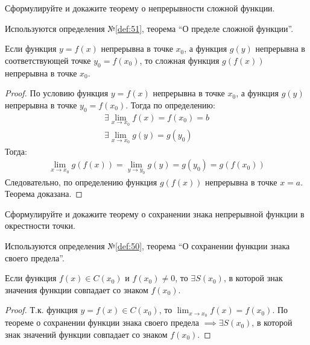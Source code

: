 \begin{question}
    Сформулируйте и докажите теорему о непрерывности сложной функции.
\end{question}
\begin{used}
    Используются определения №\ref{def:51}, теорема ``О пределе сложной функции''.
\end{used}
\begin{theorem}
    Если функция $y = f(x)$ непрерывна в точке $x_0$, а функция $g(y)$ непрерывна в соответствующей точке $y_0 = f(x_0)$, то сложная функция $g(f(x))$ непрерывна в точке $x_0$.
\end{theorem}
\begin{proof}
    По условию функция $y = f(x)$ непрерывна в точке $x_0$, а функция $g(y)$ непрерывна в точке $y_0 = f(x_0)$. Тогда по определению:
    \begin{gather*}
        \exists \lim_{x \to x_0} f(x) = f(x_0) = b \\
        \exists \lim_{x \to x_0} g(y) = g(y_0)
    \end{gather*}
    Тогда:
    \begin{gather*}
        \lim_{x \to x_0} g(f(x)) = \lim_{y \to y_0} g(y) = g(y_0) = g(f(x_0))
    \end{gather*}
    Следовательно, по определению функция $g(f(x))$ непрерывна в точке $x = a$. Теорема доказана.  
\end{proof}
\pagebreak



\begin{question}
    Сформулируйте и докажите теорему о сохранении знака непрерывной функции в окрестности точки.
\end{question}
\begin{used}
    Используются определения №\ref{def:50}, теорема ``О сохранении функции знака своего предела''.
\end{used}
\begin{theorem}
    Если функция $f(x) \in C(x_0)$ и $f(x_0) \neq 0$, то $\exists S(x_0)$, в которой знак значения функции совпадает со знаком $f(x_0)$.
\end{theorem}
\begin{proof}
    Т.к. функция $y = f(x) \in C(x_0)$, то $\lim_{x \to x_0} f(x) = f(x_0)$. 
    По теореме о сохранении функции знака своего предела $\implies \exists S(x_0)$, в которой знак значений функции совпадает со знаком $f(x_0)$.
\end{proof}
\pagebreak



